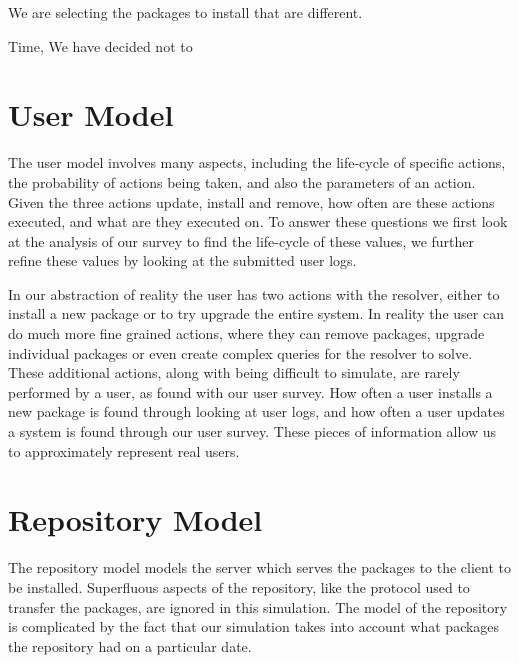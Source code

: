 We are selecting the packages to install that are different.

Time, We have decided not to 


\section{User Model}
{}The user model involves many aspects, including the life-cycle of specific actions, the probability of actions being taken, and also the parameters of an action.
{}Given the three actions update, install and remove, how often are these actions executed, and what are they executed on.
{}To answer these questions we first look at the analysis of our survey to find the life-cycle of these values, we further refine these values by looking at the submitted user logs.

In our abstraction of reality the user has two actions with the resolver, either to install a new package or to try upgrade the entire system.  
In reality the user can do much more fine grained actions, where they can remove packages, 
upgrade individual packages or even create complex queries for the resolver to solve. 
These additional actions, along with being difficult to simulate, are rarely performed by a user, as found with our user survey. %
How often a user installs a new package is found through looking at user logs, %
and how often a user updates a system is found through our user survey.
These pieces of information allow us to approximately represent real users.


\section{Repository Model}
{}The repository model models the server which serves the packages to the client to be installed.
{}Superfluous aspects of the repository, like the protocol used to transfer the packages, are ignored in this simulation.
{}The model of the repository is complicated by the fact that our simulation takes into account what packages the repository had on a particular date.



